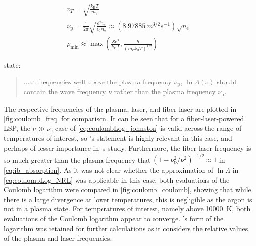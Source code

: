         \begin{gather}
            v_T = \sqrt{\frac{k_\mathrm{B}T}{m_\mathrm{e}}} \\
            \nu_\mathrm{p} = \frac{1}{2\pi}\sqrt{\frac{e^2n_\mathrm{e}}{\epsilon_0 m_\mathrm{e}}} \approx (\qty{8.97885}{m^{3/2}s^{-1}})\sqrt{n_\mathrm{e}}\\
            \rho_\mathrm{min} \approx \max{\left(\frac{Ze^2}{k_\mathrm{B}T}, \frac{\hbar}{(m_\mathrm{e}k_\mathrm{B}T)^{1/2}}\right)}
        \end{gather}
        
        \textcite{johnstonCorrectValuesHighfrequency1973} state:
        \begin{quote}
            ...at frequencies well above the plasma frequency $\nu_\mathrm{p}$, $\ln{\Lambda}(\nu)$ should contain the wave frequency $\nu$ rather than the plasma frequency $\nu_\mathrm{p}$.
        \end{quote}
        The respective frequencies of the plasma,  laser, and fiber laser are plotted in \autoref{fig:coulomb_freq} for comparison. It can be seen that for a fiber-laser-powered LSP, the $\nu \gg \nu_\mathrm{p}$ case of \autoref{eq:coulombLog_johnston} is valid across the range of temperatures of interest, so \citeauthor{johnstonCorrectValuesHighfrequency1973}'s statement is highly relevant in this case, and perhaps of lesser importance in \citeauthor{nassarInvestigationLasersustainedPlasma2012}'s study. Furthermore, the fiber laser frequency is so much greater than the plasma frequency that $(1-\nu_\mathrm{p}^2/\nu^2)^{-1/2} \approx 1$ in \autoref{eq:ib_absorption}. As it was not clear whether the approximation of $\ln{\Lambda}$ in \autoref{eq:coulombLog_NRL} was applicable in this case, both evaluations of the Coulomb logarithm were compared in \autoref{fig:coulomb_coulomb}, showing that while there is a large divergence at lower temperatures, this is negligible as the argon is not in a plasma state. For temperatures of interest, namely above \qty{10000}{K}, both evaluations of the Coulomb logarithm appear to converge. \citeauthor{johnstonCorrectValuesHighfrequency1973}'s form of the logarithm was retained for further calculations as it considers the relative values of the plasma and laser frequencies.

